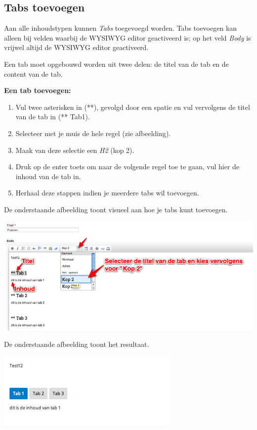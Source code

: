 \subsection{Tabs toevoegen}\label{tabstoevoegen}
Aan alle inhoudstypen kunnen \emph{Tabs} toegevoegd worden. 
Tabs toevoegen kan alleen bij velden waarbij de WYSIWYG editor geactiveerd is; op het veld \emph{Body} is vrijwel altijd de WYSIWYG editor geactiveerd.

Een tab moet opgebouwd worden uit twee delen: de titel van de tab en de content van de tab.

\textbf{Een tab toevoegen:} 

\begin{enumerate}
\item Vul twee asterisken in (**), gevolgd door een spatie en vul vervolgens de titel van de tab in (** Tab1).
\item Selecteer met je muis de hele regel (zie afbeelding).
\item Maak van deze selectie een \emph{H2} (kop 2).
\item Druk op de enter toets om naar de volgende regel toe te gaan, vul hier de inhoud van de tab in.
\item Herhaal deze stappen indien je meerdere tabs wil toevoegen.
\end{enumerate}

De onderstaande afbeelding toont visueel aan hoe je tabs kunt toevoegen.

\begin{center}
	\includegraphics[width=\textwidth]{img/tabs1}
\end{center}

De onderstaande afbeelding toont het resultaat.

\begin{center}
	\includegraphics[width=\textwidth]{img/tabs2}
\end{center}